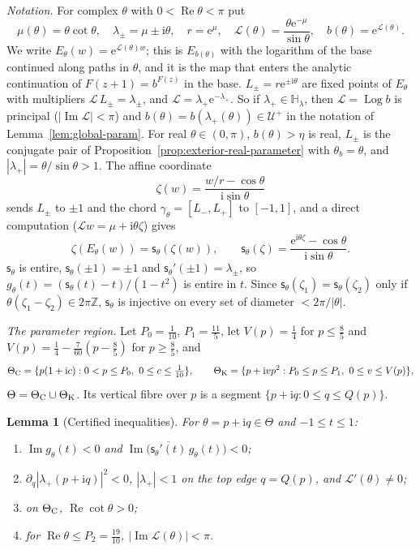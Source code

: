 \documentclass[11pt]{amsart}
\newtheorem{lemma}[theorem]{Lemma}
\theoremstyle{definition}
\newcommand{\eee}{\mathrm{e}}
\newcommand{\ii}{\mathrm{i}}
\begin{document}
\emph{Notation.}  For complex $\theta$ with $0<\operatorname{Re}\theta<\pi$ put
\[
 \mu(\theta)=\theta\cot\theta,\quad \lambda_\pm=\mu\pm\ii\theta,\quad
 r=\eee^{\mu},\quad \mathcal L(\theta)=\frac{\theta\eee^{-\mu}}{\sin\theta},\quad
 b(\theta)=\eee^{\mathcal L(\theta)} .
\]
We write $E_\theta(w)=\eee^{\mathcal L(\theta)w}$; this is $E_{b(\theta)}$ with the logarithm of the base
continued along paths in $\theta$, and it is the map that enters the analytic
continuation of $F(z+1)=b^{F(z)}$ in the base.  $L_\pm=r\eee^{\pm\ii\theta}$ are fixed points
of $E_\theta$ with multipliers $\mathcal L\,L_\pm=\lambda_\pm$, and $\mathcal L=\lambda_+\eee^{-\lambda_+}$.  So if
$\lambda_+\in\mathbb H_\lambda$, then $\mathcal L=\operatorname{Log}b$ is principal ($|\operatorname{Im}\mathcal L|<\pi$) and $b(\theta)=b(\lambda_+(\theta))\in\mathcal U^+$
in the notation of Lemma~\ref{lem:global-param}.  For real $\theta\in(0,\pi)$, $b(\theta)>\eta$ is real, $L_\pm$ is the
conjugate pair of Proposition~\ref{prop:exterior-real-parameter} with $\theta_b=\theta$, and
$|\lambda_+|=\theta/\sin\theta>1$.  The affine coordinate
\[
 \zeta(w)=\frac{w/r-\cos\theta}{\ii\sin\theta}
\]
sends $L_\pm$ to $\pm1$ and the chord $\gamma_\theta=[L_-,L_+]$ to $[-1,1]$, and a direct
computation ($\mathcal L w=\mu+\ii\theta\zeta$) gives
\[
 \zeta(E_\theta(w))=\mathsf s_\theta(\zeta(w)),\qquad \mathsf s_\theta(\zeta)=\frac{\eee^{\ii\theta\zeta}-\cos\theta}{\ii\sin\theta} .
\]
$\mathsf s_\theta$ is entire, $\mathsf s_\theta(\pm1)=\pm1$ and $\mathsf s_\theta'(\pm1)=\lambda_\pm$, so
$g_\theta(t)=(\mathsf s_\theta(t)-t)/(1-t^2)$ is entire in $t$.  Since $\mathsf s_\theta(\zeta_1)=\mathsf s_\theta(\zeta_2)$ only if
$\theta(\zeta_1-\zeta_2)\in2\pi\mathbb Z$, $\mathsf s_\theta$ is injective on every set of diameter
$<2\pi/|\theta|$.

\emph{The parameter region.}  Let $P_0=\tfrac1{10}$, $P_1=\tfrac{11}5$, let $V(p)=\tfrac14$ for $p\le\tfrac85$
and $V(p)=\tfrac14-\tfrac7{60}(p-\tfrac85)$ for $p\ge\tfrac85$, and
\[
 \Theta_{\rm C}=\{p(1+\ii c):0<p\le P_0,\ 0\le c\le\tfrac1{10}\},\qquad
 \Theta_{\rm K}=\{p+\ii vp^2:P_0\le p\le P_1,\ 0\le v\le V(p)\},
\]
$\Theta=\Theta_{\rm C}\cup\Theta_{\rm K}$.  Its vertical fibre over $p$ is a segment
$\{p+\ii q:0\le q\le Q(p)\}$.

\begin{lemma}[Certified inequalities]\label{lem:far-cert}
For $\theta=p+\ii q\in\Theta$ and $-1\le t\le1$:
\begin{enumerate}
\item $\operatorname{Im}g_\theta(t)<0$ and $\operatorname{Im}\bigl(\overline{\mathsf s_\theta'(t)}\,g_\theta(t)\bigr)<0$;
\item $\partial_q|\lambda_+(p+\ii q)|^2<0$, $|\lambda_+|<1$ on the top edge $q=Q(p)$, and $\mathcal L'(\theta)\ne0$;
\item on $\Theta_{\rm C}$, $\operatorname{Re}\cot\theta>0$;
\item for $\operatorname{Re}\theta\le P_2=\tfrac{19}{10}$, $|\operatorname{Im}\mathcal L(\theta)|<\pi$.
\end{enumerate}
\end{lemma}
\end{document}
